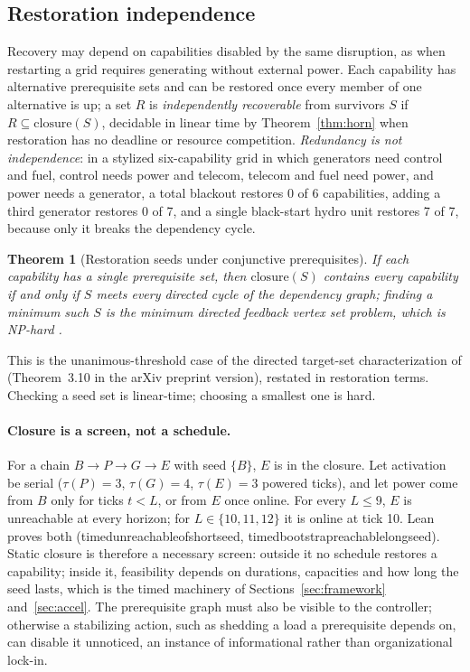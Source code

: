 \documentclass[11pt]{article}
\theoremstyle{plain}
\newtheorem{theorem}{Theorem}
\theoremstyle{definition}
\newcommand{\lean}[1]{{\ttfamily\renewcommand{\_}{\textunderscore\allowbreak}#1}}
\begin{document}
\subsection{Restoration independence}

Recovery may depend on capabilities disabled by the same disruption, as when restarting a grid requires generating without external power. Each capability has alternative prerequisite sets and can be restored once every member of one alternative is up; a set $R$ is \emph{independently recoverable} from survivors $S$ if $R\subseteq\mathrm{closure}(S)$, decidable in linear time by Theorem~\ref{thm:horn} when restoration has no deadline or resource competition. \emph{Redundancy is not independence}: in a stylized six-capability grid in which generators need control and fuel, control needs power and telecom, telecom and fuel need power, and power needs a generator, a total blackout restores 0 of 6 capabilities, adding a third generator restores 0 of 7, and a single black-start hydro unit restores 7 of 7, because only it breaks the dependency cycle.

\begin{theorem}[Restoration seeds under conjunctive prerequisites]\label{thm:fvs}
If each capability has a single prerequisite set, then $\mathrm{closure}(S)$ contains every capability if and only if $S$ meets every directed cycle of the dependency graph; finding a minimum such $S$ is the minimum directed feedback vertex set problem, which is NP-hard \citep{Karp1972}.
\end{theorem}

This is the unanimous-threshold case of the directed target-set characterization of \citet{FeigeKogan2021} (Theorem~3.10 in the arXiv preprint version), restated in restoration terms. Checking a seed set is linear-time; choosing a smallest one is hard.

\paragraph{Closure is a screen, not a schedule.} For a chain $B\to P\to G\to E$ with seed $\{B\}$, $E$ is in the closure. Let activation be serial ($\tau(P)=3$, $\tau(G)=4$, $\tau(E)=3$ powered ticks), and let power come from $B$ only for ticks $t<L$, or from $E$ once online. For every $L\le9$, $E$ is unreachable at every horizon; for $L\in\{10,11,12\}$ it is online at tick 10. Lean proves both (\lean{timed\_unreachable\_of\_short\_seed}, \lean{timed\_bootstrap\_reachable\_long\_seed}). Static closure is therefore a necessary screen: outside it no schedule restores a capability; inside it, feasibility depends on durations, capacities and how long the seed lasts, which is the timed machinery of Sections~\ref{sec:framework} and~\ref{sec:accel}. The prerequisite graph must also be visible to the controller; otherwise a stabilizing action, such as shedding a load a prerequisite depends on, can disable it unnoticed, an instance of informational rather than organizational lock-in.
\end{document}
